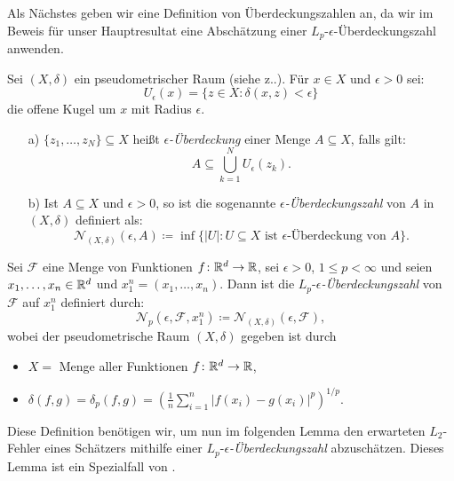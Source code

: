 {Als Nächstes geben wir eine Definition von Überdeckungszahlen an, da wir im Beweis für unser Hauptresultat eine Abschätzung einer $L_p\text{-}\epsilon$-Überdeckungszahl anwenden.
\begin{defn}
\label{ueberdeckung}
Sei $(X, \delta)$ ein pseudometrischer Raum (siehe z.\@B.\@ \cite[Definition 2.1.1]{Topologie2015}). Für $x \in X$ und $\epsilon > 0$ sei:
$$U_{\epsilon}(x) = \{z \in X : \delta(x, z) < \epsilon\}$$
die offene Kugel um $x$ mit Radius $\epsilon$.
\begin{itemize}
\item[a)] $\{z_1,\dots,z_N\} \subseteq X$ heißt $\epsilon$\textit{-Überdeckung} einer Menge $A \subseteq X$, falls gilt:
$$A \subseteq \bigcup_{k = 1}^N U_{\epsilon}(z_k).$$
\item[b)] Ist $A \subseteq X$ und $\epsilon > 0$, so ist die sogenannte $\epsilon$\textit{-Überdeckungszahl} von $A$ in $(X,\delta)$ definiert als:
$$\mathcal{N}_{(X,\delta)}(\epsilon, A) \coloneqq \inf\big\{|U| : U \subseteq X \text{ ist } \epsilon\text{-Überdeckung von } A\big\}.$$   
\end{itemize}
\end{defn} 
\begin{defn}
\label{lpe}
Sei $\mathcal{F}$ eine Menge von Funktionen $f\colon \mathbb{R}^d \to \mathbb{R}$, sei $\epsilon > 0$, $1 \leq p < \infty$ und seien $x_1,\dots,x_n \in \mathbb{R}^d$ und $x_1^n = (x_1,\dots,x_n).$ Dann ist die $L_p$-$\epsilon$\textit{-Überdeckungszahl} von $\mathcal{F}$ auf $x_1^n$ definiert durch:
$$\mathcal{N}_p(\epsilon, \mathcal{F}, x_1^n) \coloneqq \mathcal{N}_{(X,\delta)}(\epsilon, \mathcal{F}),$$
wobei der pseudometrische Raum $(X, \delta)$ gegeben ist durch
\begin{itemize}
\item $X = $ Menge aller Funktionen $f\colon \mathbb{R}^d \to \mathbb{R}$,
\item $\delta(f, g) = \delta_p(f, g) = (\frac{1}{n}\sum_{i = 1}^n |f(x_i) - g(x_i)|^p)^{1/p} .$
\end{itemize}
\end{defn}
Diese Definition benötigen wir, um nun im folgenden Lemma den erwarteten $L_2$-Fehler eines Schätzers mithilfe einer $L_p$-$\epsilon$\textit{-Überdeckungszahl} abzuschätzen. Dieses Lemma ist ein Spezialfall von \cite[Lemma 8]{kohler19}.
}
